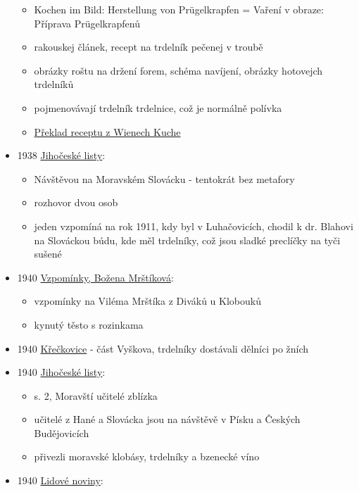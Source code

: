 \begin{itemize}
  \begin{itemize}
  \tightlist
  \item
    Kochen im Bild: Herstellung von Prügelkrapfen = Vaření v obraze:
    Příprava Prügelkrapfenů
  \item
    rakouskej článek, recept na trdelník pečenej v troubě
  \item
    obrázky roštu na držení forem, schéma navíjení, obrázky hotovejch
    trdelníků
  \item
    pojmenovávají trdelník trdelnice, což je normálně polívka
  \item
    \hyperref[250615-0047]{Překlad receptu z Wienech Kuche}
  \end{itemize}
\item
  1938
  \href{https://ceskadigitalniknihovna.cz/uuid/uuid:e6636d2b-f486-4e2f-b5ae-fb4e89b772e4}{Jihočeské
  listy}:

  \begin{itemize}
  \tightlist
  \item
    Návštěvou na Moravském Slovácku - tentokrát bez metafory
  \item
    rozhovor dvou osob
  \item
    jeden vzpomíná na rok 1911, kdy byl v Luhačovicích, chodil k dr.
    Blahovi na Slováckou búdu, kde měl trdelníky, což jsou sladké
    preclíčky na tyči sušené
  \end{itemize}
\item
  1940
  \href{https://ndk.cz/view/uuid:911977c0-052e-11e8-816d-5ef3fc9bb22f?page=uuid\%3Aa0797b50-0cb5-11e8-8ee4-005056825209}{Vzpomínky,
  Božena Mrštíková}:

  \begin{itemize}
  \tightlist
  \item
    vzpomínky na Viléma Mrštíka z Diváků u Klobouků
  \item
    kynutý těsto s rozinkama
  \end{itemize}
\item
  1940
  \href{https://ceskadigitalniknihovna.cz/view/uuid:d065e200-90ad-11e8-87bd-005056827e52?page=uuid:47609990-a79c-11e8-ba56-5ef3fc9bb22f&fulltext=trdeln\%C3\%ADky&source=nkp}{Křečkovice}
  - část Vyškova, trdelníky dostávali dělníci po žních
\item
  1940
  \href{https://ceskadigitalniknihovna.cz/uuid/uuid:c6220b36-bdd1-4eec-94b2-2bed755a042a}{Jihočeské
  listy}:

  \begin{itemize}
  \tightlist
  \item
    s. 2, Moravští učitelé zblízka
  \item
    učitelé z Hané a Slovácka jsou na návštěvě v Písku a Českých
    Budějovicích
  \item
    přivezli moravské klobásy, trdelníky a bzenecké víno
  \end{itemize}
\item
  1940
  \href{https://ceskadigitalniknihovna.cz/uuid/uuid:9582fdd0-6e03-11dd-a59e-000d606f5dc6}{Lidové
  noviny}:


\end{itemize}
